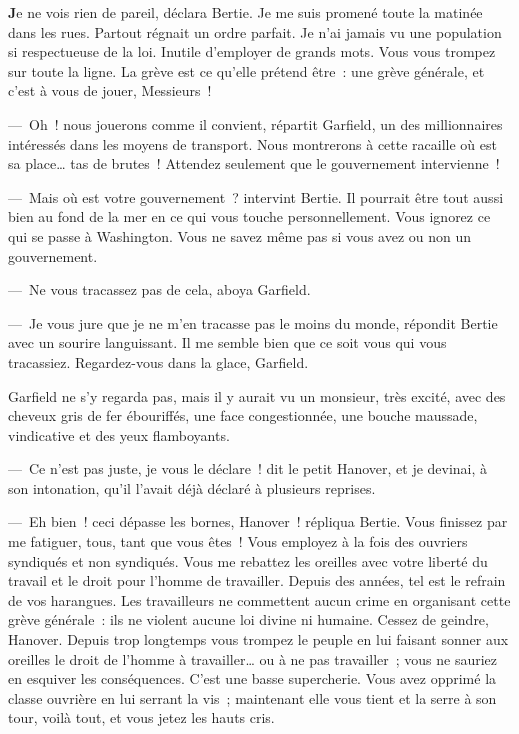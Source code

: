 \documentclass[french,twoside]{book} %
\begin{document}
\noindent \textbf{J}e ne vois rien de pareil, déclara Bertie. Je me suis promené toute la matinée dans les rues. Partout régnait un ordre parfait. Je n’ai jamais vu une population si respectueuse de la loi. Inutile d’employer de grands mots. Vous vous trompez sur toute la ligne. La grève est ce qu’elle prétend être : une grève générale, et c’est à vous de jouer, Messieurs !\par
— Oh ! nous jouerons comme il convient, répartit Garfield, un des millionnaires intéressés dans les moyens de transport. Nous montrerons à cette racaille où est sa place… tas de brutes ! Attendez seulement que le gouvernement intervienne !\par
— Mais où est votre gouvernement ? intervint Bertie. Il pourrait être tout aussi bien au fond de la mer en ce qui vous touche personnellement. Vous ignorez ce qui se passe à Washington. Vous ne savez même pas si vous avez ou non un gouvernement.\par
— Ne vous tracassez pas de cela, aboya Garfield.\par
— Je vous jure que je ne m’en tracasse pas le moins du monde, répondit Bertie avec un sourire languissant. Il me semble bien que ce soit vous qui vous tracassiez. Regardez-vous dans la glace, Garfield.\par
Garfield ne s’y regarda pas, mais il y aurait vu un monsieur, très excité, avec des cheveux gris de fer ébouriffés, une face congestionnée, une bouche maussade, vindicative et des yeux flamboyants.\par
— Ce n’est pas juste, je vous le déclare ! dit le petit Hanover, et je devinai, à son intonation, qu’il l’avait déjà déclaré à plusieurs reprises.\par
— Eh bien ! ceci dépasse les bornes, Hanover ! répliqua Bertie. Vous finissez par me fatiguer, tous, tant que vous êtes ! Vous employez à la fois des ouvriers syndiqués et non syndiqués. Vous me rebattez les oreilles avec votre liberté du travail et le droit pour l’homme de travailler. Depuis des années, tel est le refrain de vos harangues. Les travailleurs ne commettent aucun crime en organisant cette grève générale : ils ne violent aucune loi divine ni humaine. Cessez de geindre, Hanover. Depuis trop longtemps vous trompez le peuple en lui faisant sonner aux oreilles le droit de l’homme à travailler… ou à ne pas travailler ; vous ne sauriez en esquiver les conséquences. C’est une basse supercherie. Vous avez opprimé la classe ouvrière en lui serrant la vis ; maintenant elle vous tient et la serre à son tour, voilà tout, et vous jetez les hauts cris.\par
\end{document}
